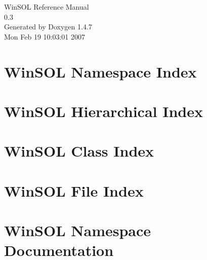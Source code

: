\documentclass[a4paper]{book}
\begin{document}
\begin{titlepage}
\vspace*{7cm}
\begin{center}
{\Large Win\-SOL Reference Manual\\[1ex]\large 0.3 }\\
\vspace*{1cm}
{\large Generated by Doxygen 1.4.7}\\
\vspace*{0.5cm}
{\small Mon Feb 19 10:03:01 2007}\\
\end{center}
\end{titlepage}
\clearemptydoublepage
{}
\tableofcontents
\clearemptydoublepage
{}
\chapter{Win\-SOL Namespace Index}

\chapter{Win\-SOL Hierarchical Index}

\chapter{Win\-SOL Class Index}

\chapter{Win\-SOL File Index}

\chapter{Win\-SOL Namespace Documentation}




\end{document}
